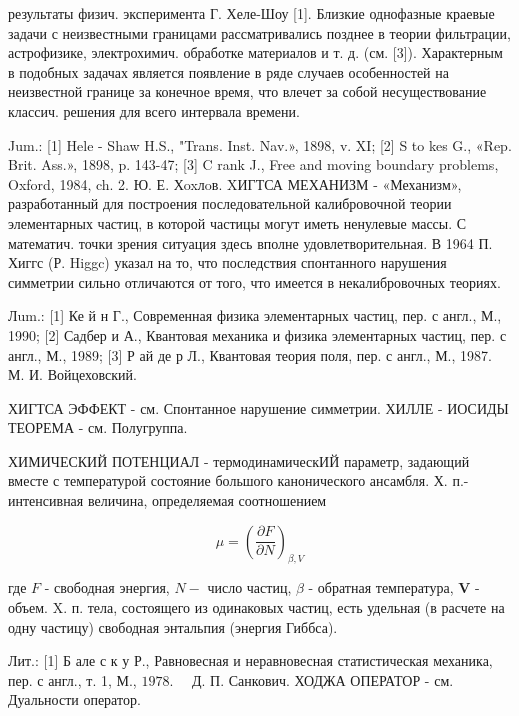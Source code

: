 \documentclass[10pt]{article}
\begin{document}
результаты физич. эксперимента Г. Хеле-Шоу [1]. Близкие однофазные краевые задачи с неизвестными границами рассматривались позднее в теории фильтрации, астрофизике, электрохимич. обработке материалов и т. д. (см. [3]). Характерным в подобных задачах является появление в ряде случаев особенностей на неизвестной границе за конечное время, что влечет за собой несуществование классич. решения для всего интервала времени.



Jum.: [1] Hele - Shaw H.S., "Trans. Inst. Nav.», 1898, v. XI; [2] S to kes G., «Rep. Brit. Ass.», 1898, p. 143-47; [3] C rank J., Free and moving boundary problems, Oxford, 1984, ch. 2. Ю. Е. Хoxлoв. XИГТСА МЕХАНИЗМ - «Механизм», разработанный для построения последовательной калибровочной теории элементарных частиц, в которой частицы могут иметь ненулевые массы. С математич. точки зрения ситуация здесь вполне удовлетворительная. В 1964 П. Хиггс (Р. Higgc) указал на то, что последствия спонтанного нарушения симметрии сильно отличаются от того, что имеется в некалибровочных теориях.



Лum.: [1] Ке й н Г., Современная физика элементарных частиц, пер. с англ., М., 1990; [2] Садбер и А., Квантовая механика и физика элементарных частиц, пер. с англ., М., 1989; [3] Р ай де р Л., Квантовая теория поля, пер. с англ., М., 1987. М. И. Войцеховский.



ХИГТСА ЭФФЕКТ - см. Спонтанное нарушение симметрии. ХИЛЛЕ - ИОСИДЫ ТЕОРЕМА - см. Полугруппа.



ХИМИЧЕСКИЙ ПОТЕНЦИАЛ - термодинамическИЙ параметр, задающий вместе с температурой состояние большого канонического ансамбля. Х. п.- интенсивная величина, определяемая соотношением



\[

\mu=\left(\frac{\partial F}{\partial N}\right)_{\beta, V}

\]



где $F$ - свободная энергия, $N-$ число частиц, $\beta$ - обратная температура, $\boldsymbol{V}$ - объем. X. п. тела, состоящего из одинаковых частиц, есть удельная (в расчете на одну частицу) свободная энтальпия (энергия Гиббса).



Лит.: [1] Б але с к у Р., Равновесная и неравновесная статистическая механика, пер. с англ., т. 1, М., $1978 . \quad$ Д. П. Санкович. ХОДЖА ОПЕРАТОР - см. Дуальности оператор.
\end{document}
